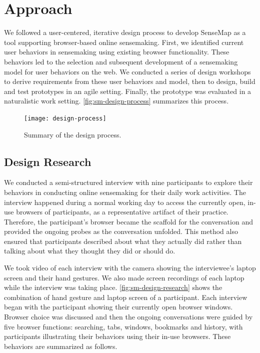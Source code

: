 \section{Approach}
We followed a user-centered, iterative design process to develop SenseMap as a tool supporting browser-based online sensemaking. First, we identified current user behaviors in sensemaking using existing browser functionality. These behaviors led to the selection and subsequent development of a sensemaking model for user behaviors on the web. We conducted a series of design workshops to derive requirements from these user behaviors and model, then to design, build and test prototypes in an agile setting. Finally, the prototype was evaluated in a naturalistic work setting. \autoref{fig:sm-design-process} summarizes this process.

\begin{figure}[!htb]
	\centering
	\texttt{[image: design-process]}
	\caption{Summary of the design process.}
	\label{fig:sm-design-process}
\end{figure}

\subsection{Design Research}
We conducted a semi-structured interview with nine participants to explore their behaviors in  conducting online sensemaking for their daily work activities. The interview happened during a normal working day to access the currently open, in-use browsers of participants, as a representative artifact of their practice. Therefore, the participant's browser became the scaffold for the conversation and provided the ongoing probes as the conversation unfolded. This method also ensured that participants described about what they actually did rather than talking about what they thought they did or should do.

We took video of each interview with the camera showing the interviewee's laptop screen and their hand gestures. We also made screen recordings of each laptop while the interview was taking place. \autoref{fig:sm-design-research} shows the combination of hand gesture and laptop screen of a participant. Each interview began with the participant showing their currently open browser windows. Browser choice was discussed and then the ongoing conversations were guided by five browser functions: searching, tabs, windows, bookmarks and history, with participants illustrating their behaviors using their in-use browsers. These behaviors are summarized as follows.

